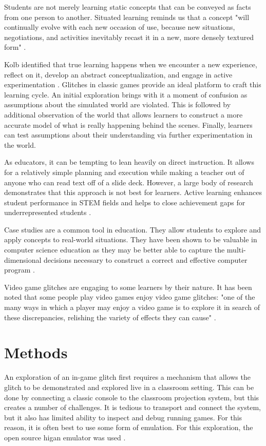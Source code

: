 \documentclass[letterpaper]{article}
\begin{document}
Students are not merely learning static concepts that can be conveyed as facts from one person to another. Situated learning reminds us that a concept "will continually evolve with each new occasion of use, because new situations, negotiations, and activities inevitably recast it in a new, more densely textured form" \cite{brown1989situated}.

Kolb identified that true learning happens when we encounter a new experience, reflect on it, develop an abstract conceptualization, and engage in active experimentation \cite{kolb84}. Glitches in classic games provide an ideal platform to craft this learning cycle. An initial exploration brings with it a moment of confusion as assumptions about the simulated world are violated. This is followed by additional observation of the world that allows learners to construct a more accurate model of what is really happening behind the scenes. Finally, learners can test assumptions about their understanding via further experimentation in the world.

As educators, it can be tempting to lean heavily on direct instruction. It allows for a relatively simple planning and execution while making a teacher out of anyone who can read text off of a slide deck. However, a large body of research demonstrates that this approach is not best for learners. Active learning enhances student performance in STEM fields \cite{freeman2014active} and helps to close achievement gaps for underrepresented students \cite{theobald2020active}.

Case studies are a common tool in education. They allow students to explore and apply concepts to real-world situations. They have been shown to be valuable in computer science education as they may be better able to capture the multi-dimensional decisions necessary to construct a correct and effective computer program \cite{linn1992case}.

Video game glitches are engaging to some learners by their nature. It has been noted that some people play video games enjoy video game glitches: "one of the many ways in which a player may enjoy a video game is to explore it in search of these discrepancies, relishing the variety of effects they can cause" \cite{bainbridge2007creative}.

\section{Methods}
An exploration of an in-game glitch first requires a mechanism that allows the glitch to be demonstrated and explored live in a classroom setting. This can be done by connecting a classic console to the classroom projection system, but this creates a number of challenges. It is tedious to transport and connect the system, but it also has limited ability to inspect and debug running games. For this reason, it is often best to use some form of emulation. For this exploration, the open source higan emulator was used \cite{ginder2004higan}.
\end{document}
